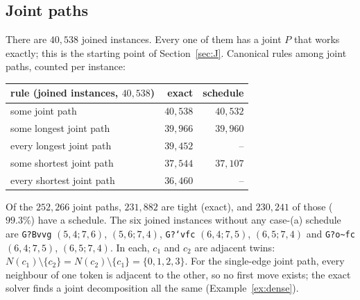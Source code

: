 \documentclass[11pt]{amsart}
\theoremstyle{definition}
\begin{document}
\subsection*{Joint paths}
There are $40{,}538$ joined instances. Every one of them has a joint $P$ that works exactly; this is
the starting point of Section~\ref{sec:J}. Canonical rules among joint paths, counted per instance:
\begin{center}\footnotesize
\begin{tabular}{@{}lrr@{}}
\toprule
rule (joined instances, $40{,}538$) & exact & schedule\\
\midrule
some joint path & $40{,}538$ & $40{,}532$\\
some longest joint path & $39{,}966$ & $39{,}960$\\
every longest joint path & $39{,}452$ & --\\
some shortest joint path & $37{,}544$ & $37{,}107$\\
every shortest joint path & $36{,}460$ & --\\
\bottomrule
\end{tabular}
\end{center}
Of the $252{,}266$ joint paths, $231{,}882$ are tight (exact), and $230{,}241$ of those ($99.3\%$)
have a schedule. The six joined instances without any case-(a) schedule are
\texttt{G?Bvvg} $(5,4;7,6)$, $(5,6;7,4)$, \texttt{G?`vfc} $(6,4;7,5)$, $(6,5;7,4)$ and
\texttt{G?o\~{}fc} $(6,4;7,5)$, $(6,5;7,4)$. In each, $c_1$ and $c_2$ are adjacent twins:
$N(c_1)\setminus\{c_2\}=N(c_2)\setminus\{c_1\}=\{0,1,2,3\}$. For the single-edge joint path, every
neighbour of one token is adjacent to the other, so no first move exists; the exact solver finds a
joint decomposition all the same (Example~\ref{ex:dense}).
\end{document}
